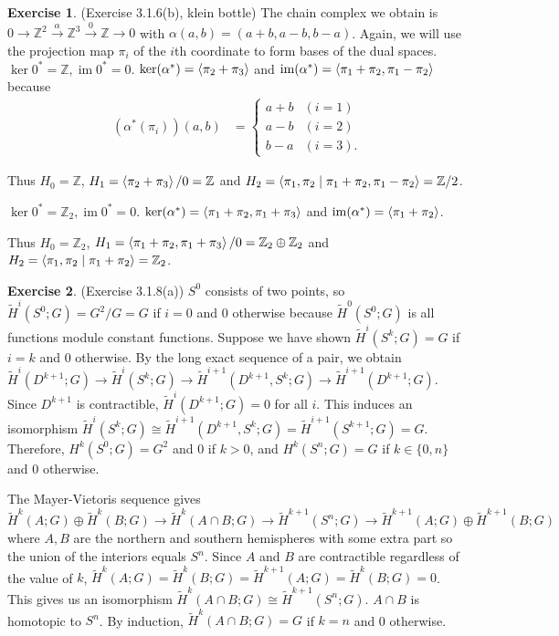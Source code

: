 \documentclass[12pt, psamsfonts]{amsart}
\theoremstyle{definition}
\newtheorem*{exer}{Exercise}
\theoremstyle{remark}
\DeclareMathOperator{\im}{im}
\numberwithin{equation}{section}
\begin{document}
\begin{exer}{(Exercise 3.1.6(b), klein bottle)}
  The chain complex we obtain is $0 \rightarrow \mathbb{Z}^2 \xrightarrow{\alpha} \mathbb{Z}^3 \xrightarrow{0} \mathbb{Z} \rightarrow 0$ with $\alpha(a, b) = (a + b, a - b, b - a)$.
  Again, we will use the projection map $\pi_i$ of the $i$th coordinate to form bases of the dual spaces.
  $\ker 0^{\ast} = \mathbb{Z}, \im 0^{\ast} = 0$.
  $\ker(\alpha^{\ast}) = \ev{\pi_2 + \pi_3}$ and $\im(\alpha^{\ast}) = \ev{\pi_1 + \pi_2, \pi_1 - \pi_2}$ because
  \begin{align*}
    (\alpha^{\ast}(\pi_i))(a, b) &= \begin{cases}
      a + b & (i = 1) \\
      a - b & (i = 2) \\
      b - a & (i = 3).
    \end{cases}
  \end{align*}

  Thus $H_0 = \mathbb{Z}$, $H_1 = \ev{\pi_2 + \pi_3} / 0 = \mathbb{Z}$ and $H_2 = \ev{\pi_1, \pi_2 \mid \pi_1 + \pi_2, \pi_1 - \pi_2} = \mathbb{Z} / 2$.

  $\ker 0^{\ast} = \mathbb{Z}_2, \im 0^{\ast} = 0$.
  $\ker(\alpha^{\ast}) = \ev{\pi_1 + \pi_2, \pi_1 + \pi_3}$ and $\im(\alpha^{\ast}) = \ev{\pi_1 + \pi_2}$.

  Thus $H_0 = \mathbb{Z}_2$, $H_1 = \ev{\pi_1 + \pi_2, \pi_1 + \pi_3} / 0 = \mathbb{Z}_2 \oplus \mathbb{Z}_2$ and $H_2 = \ev{\pi_1, \pi_2 \mid \pi_1 + \pi_2} = \mathbb{Z}_2$.
\end{exer}

\begin{exer}{(Exercise 3.1.8(a))}
  $S^0$ consists of two points, so $\tilde{H}^i(S^0; G) = G^2 / G = G$ if $i = 0$ and 0 otherwise because $\tilde{H}^0(S^0; G)$ is all functions module constant functions.
  Suppose we have shown $\tilde{H}^i(S^k; G) = G$ if $i = k$ and 0 otherwise.
  By the long exact sequence of a pair, we obtain $\tilde{H}^i(D^{k + 1}; G) \rightarrow \tilde{H}^i(S^k; G) \rightarrow \tilde{H}^{i + 1}(D^{k + 1}, S^k; G) \rightarrow \tilde{H}^{i + 1}(D^{k + 1}; G)$.
  Since $D^{k + 1}$ is contractible, $\tilde{H}^i(D^{k + 1}; G) = 0$ for all $i$.
  This induces an isomorphism $\tilde{H}^i(S^k; G) \cong \tilde{H}^{i + 1}(D^{k + 1}, S^k; G) = \tilde{H}^{i + 1}(S^{k + 1}; G) = G$.
  Therefore, $H^k(S^0; G) = G^2$ and 0 if $k > 0$, and $H^k(S^n; G) = G$ if $k \in \{ 0, n \}$ and 0 otherwise.

  The Mayer-Vietoris sequence gives $\tilde{H}^k(A; G) \oplus \tilde{H}^k(B; G) \rightarrow \tilde{H}^k(A \cap B; G) \rightarrow \tilde{H}^{k + 1}(S^n; G) \rightarrow \tilde{H}^{k + 1}(A; G) \oplus \tilde{H}^{k + 1}(B; G)$ where $A, B$ are the northern and southern hemispheres with some extra part so the union of the interiors equals $S^n$. 
  Since $A$ and $B$ are contractible regardless of the value of $k$, $\tilde{H}^k(A; G) = \tilde{H}^k(B; G) = \tilde{H}^{k + 1}(A; G) = \tilde{H}^k(B; G) = 0$.
  This gives us an isomorphism $\tilde{H}^k(A \cap B; G) \cong \tilde{H}^{k + 1}(S^n; G)$.
  $A \cap B$ is homotopic to $S^n$.
  By induction, $\tilde{H}^k(A \cap B; G) = G$ if $k = n$ and 0 otherwise.
\end{exer}
\end{document}
